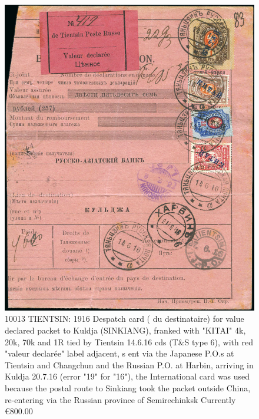 \begin{figure}[htbp]
\centering
\includegraphics[width=.95\textwidth]{../russian-post-offices-in-china/10013.jpg}
\caption{
10013 TIENTSIN: 1916 Despatch card ( du destinataire) for value declared 
packet to Kuldja (SINKIANG), franked with "KITAI" 4k, 20k, 70k and 1R tied by 
Tientsin 14.6.16 cds (T\&S type 6), with red "valeur declar\'ee" label adjacent, s
ent via the Japanese P.O.s at Tientsin and Changchun and the Russian P.O. at 
Harbin, arriving in Kuldja 20.7.16 (error "19" for "16"), the International 
card was used because the postal route to Sinkiang took the packet outside 
China, re-entering via the Russian province of Semirechinksk
Currently \euro 800.00
}  
\end{figure}

